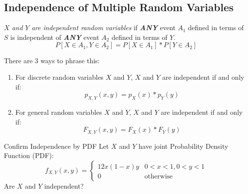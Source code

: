 	\subsection{Independence of Multiple Random Variables} \label{subsec:Independence of Multiple Random Variables}
		\begin{definition} \label{def:Independence of Multiple Random Variables}
			\emph{$X$ and $Y$ are independent random variables} if \emph{\textbf{ANY}} event $A_{1}$ defined in terms of $S$ is independent of \emph{\textbf{ANY}} event $A_{2}$ defined in terms of $Y$.
			\begin{equation} \label{eq:Independence of Multiple Random Variables}
				P \left[ X \in A_{1}, Y \in A_{2} \right] = P \left[ X \in A_{1} \right] * P \left[ Y \in A_{2} \right]
			\end{equation}
		\end{definition}
	There are 3 ways to phrase this:
	\begin{enumerate}
		\item For discrete random variables $X$ and $Y$, $X$ and $Y$ are independent if and only if:
			\begin{equation} \label{eq:Independence of Multiple Discrete Random Variables Using PMF}
				p_{X,Y} \left( x,y \right) = p_{X} \left( x \right) * p_{Y} \left( y \right)
			\end{equation}

		\item For general random variables $X$ and $Y$, $X$ and $Y$ are independent if and only if:
			\begin{equation} \label{eq:Independence of Multiple General Random Variables Using CDF}
				F_{X,Y} \left( x,y \right) = F_{X} \left( x \right) * F_{Y} \left( y \right)
			\end{equation}
	\end{enumerate}
		\begin{example}{Confirm Independence by PDF}
			Let $X$ and $Y$ have joint Probability Density Function (PDF):
			\begin{equation*}
				f_{X,Y} \left( x,y \right) = \begin{cases}
					12x \left( 1-x \right)y & 0 < x < 1, 0 < y < 1 \\
					0 & \text{otherwise}
				\end{cases}
			\end{equation*}
			Are $X$ and $Y$ independent?
		\end{example}
